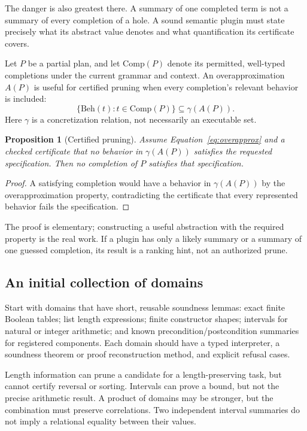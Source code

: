 \documentclass[11pt,letterpaper]{article}
\newtheorem{proposition}[theorem]{Proposition}
\theoremstyle{definition}
\theoremstyle{remark}
\begin{document}
The danger is also greatest there. A summary of one completed term is not a summary of every completion of a hole. A sound semantic plugin must state precisely what its abstract value denotes and what quantification its certificate covers.

Let $P$ be a partial plan, and let $\mathrm{Comp}(P)$ denote its permitted, well-typed completions under the current grammar and context. An overapproximation $A(P)$ is useful for certified pruning when every completion's relevant behavior is included:
\begin{equation}
 \{\mathrm{Beh}(t):t\in\mathrm{Comp}(P)\}\subseteq\gamma(A(P)).
 \label{eq:overapprox}
\end{equation}
Here $\gamma$ is a concretization relation, not necessarily an executable set.

\begin{proposition}[Certified pruning]
Assume Equation~\eqref{eq:overapprox} and a checked certificate that no behavior in $\gamma(A(P))$ satisfies the requested specification. Then no completion of $P$ satisfies that specification.
\end{proposition}
\begin{proof}
A satisfying completion would have a behavior in $\gamma(A(P))$ by the overapproximation property, contradicting the certificate that every represented behavior fails the specification.
\end{proof}

The proof is elementary; constructing a useful abstraction with the required property is the real work. If a plugin has only a likely summary or a summary of one guessed completion, its result is a ranking hint, not an authorized prune.

\subsection{An initial collection of domains}

Start with domains that have short, reusable soundness lemmas: exact finite Boolean tables; list length expressions; finite constructor shapes; intervals for natural or integer arithmetic; and known precondition/postcondition summaries for registered components. Each domain should have a typed interpreter, a soundness theorem or proof reconstruction method, and explicit refusal cases.

Length information can prune a candidate for a length-preserving task, but cannot certify reversal or sorting. Intervals can prove a bound, but not the precise arithmetic result. A product of domains may be stronger, but the combination must preserve correlations. Two independent interval summaries do not imply a relational equality between their values.
\end{document}
